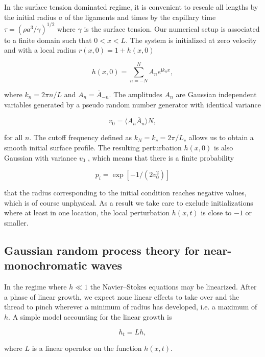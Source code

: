 \newcommand\be{\begin{equation}}
\newcommand\nd{\end{equation}}
\newcommand\ii{{\textrm{i}}}

In the surface tension dominated regime, it is convenient to rescale all lengths by the
initial radius $a$ of the ligaments and times by the capillary time
$\tau = (\rho a^3/\gamma)^{1/2}$ where $\gamma$ is the surface tension.
Our numerical setup is associated to a finite domain such that $0 < x < L$. 
The system is initialized at zero velocity and with a local radius $r(x,0) = 1 + h(x,0)$


\be
h(x,0) = \sum_{n=-N}^{N}  A_n e^{\ii k_n x} ,  \label{p1}
\nd

where $k_n=2\pi n / L$ and $A_n = \overline A_{-n}$. 
The amplitudes $A_n$ are Gaussian independent variables
generated by a pseudo random number generator with identical variance

\be
v_0 = \langle A_n \overline A_n \rangle N ,
\nd

for all $n$. The cutoff frequency defined as $k_N=k_c = 2\pi /L_c$ allows us to obtain a smooth
initial surface profile. The resulting perturbation $h(x,0)$ is also Gaussian with variance $v_0$ 
, which means that there is a finite probability

\be
p_i = \exp[{-1/(2 v_0^2)}] \label{p2}
\nd

that the radius corresponding to the initial condition reaches negative values, 
which is of course unphysical. 
As a result we take care to exclude initializations where at least in one location, 
the local perturbation $h(x,t)$ is close to $-1$ or smaller.

\subsection*{Gaussian random process theory for near-monochromatic waves}

In the regime where $h \ll 1$ the Navier--Stokes equations may be linearized.
After a phase of linear growth, we expect none linear effects to take over 
and the thread to pinch wherever a minimum of radius has developed, i.e. a maximum of $h$. 
A simple model accounting for the linear growth is  

\be
h_t = L h , 
\nd

where $L$ is a linear operator on the function $h(x,t)$.
%

